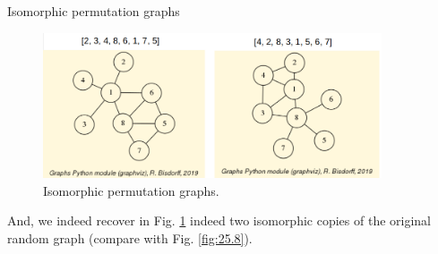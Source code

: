     Isomorphic permutation graphs
\begin{figure}[h]
\includegraphics[width=10cm]{Figures/isomorphicPerms.png}
\caption{Isomorphic permutation graphs.} 
\label{fig:25.11}       %
\end{figure}

And, we indeed recover in Fig. \ref{fig:25.11} indeed two isomorphic copies of the original random graph (compare with Fig. \ref{fig:25.8}).
 
